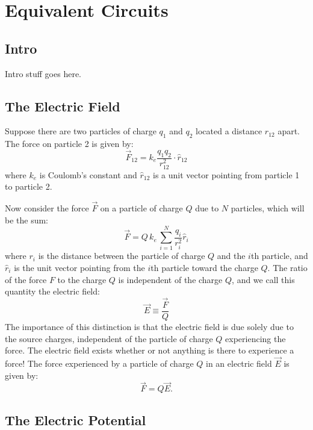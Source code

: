 
\chapter{Equivalent Circuits}

\section{Intro}
Intro stuff goes here.

\section{The Electric Field}

Suppose there are two particles of charge $q_1$ and $q_2$ located a distance $r_{12}$ apart.
The force on particle 2 is given by:
\begin{displaymath}
\vec{F}_{12} = k_e \frac{q_1 q_2}{r_{12}^2} \cdot \hat{r}_{12}
\end{displaymath}
where $k_e$ is Coulomb's constant and $\hat{r}_{12}$ is a unit vector pointing from particle 1 to particle 2.

Now consider the force $\vec{F}$ on a particle of charge $Q$ due to $N$ particles, which will be the sum:
\begin{displaymath}
\vec{F} = Q \, k_e \, \sum_{i=1}^N \frac{q_i}{r_{i}^2} \hat{r}_{i}
\end{displaymath}
where $r_i$ is the distance between the particle of charge $Q$ and the $i$th particle, and $\hat{r}_i$ is the unit vector pointing from the $i$th particle toward the charge $Q$.  The ratio of the force $F$ to the charge $Q$ is independent of the charge $Q$, and we call this quantity the electric field:
\begin{displaymath}
\vec{E} \equiv \frac{\vec{F}}{Q}
\end{displaymath}
The importance of this distinction is that the electric field is due solely due to the source charges, independent of the particle of charge $Q$ experiencing the force.  The electric field exists whether or not anything is there to experience a force!  The force experienced by a particle of charge $Q$ in an electric field $\vec{E}$ is given by:
\begin{displaymath}
\vec{F} = Q \vec{E}.
\end{displaymath}

\section{The Electric Potential}

